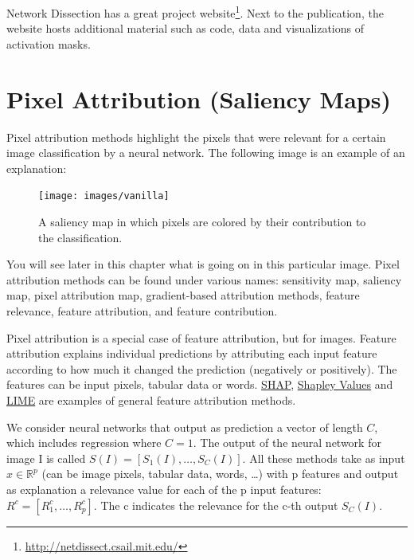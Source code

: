 \documentclass[
  12pt,
]{krantz}
\renewcommand{\href}[2]{#2\footnote{\url{#1}}}
\begin{document}
Network Dissection has a great \href{http://netdissect.csail.mit.edu/}{project website}.
Next to the publication, the website hosts additional material such as code, data and visualizations of activation masks.

\newpage

\hypertarget{pixel-attribution}{%
\section{Pixel Attribution (Saliency Maps)}\label{pixel-attribution}}

Pixel attribution methods highlight the pixels that were relevant for a certain image classification by a neural network.
The following image is an example of an explanation:

\begin{figure}

{\centering \texttt{[image: images/vanilla]} 

}

\caption{A saliency map in which pixels are colored by their contribution to the classification.}\label{fig:unnamed-chunk-61}
\end{figure}

You will see later in this chapter what is going on in this particular image.
Pixel attribution methods can be found under various names: sensitivity map, saliency map, pixel attribution map, gradient-based attribution methods, feature relevance, feature attribution, and feature contribution.

Pixel attribution is a special case of feature attribution, but for images.
Feature attribution explains individual predictions by attributing each input feature according to how much it changed the prediction (negatively or positively).
The features can be input pixels, tabular data or words.
\protect\hyperlink{shap}{SHAP}, \protect\hyperlink{shapley}{Shapley Values} and \protect\hyperlink{lime}{LIME} are examples of general feature attribution methods.

We consider neural networks that output as prediction a vector of length \(C\), which includes regression where \(C=1\).
The output of the neural network for image I is called \(S(I)=[S_1(I),\ldots,S_C(I)]\).
All these methods take as input \(x\in\mathbb{R}^p\) (can be image pixels, tabular data, words, \ldots) with p features and output as explanation a relevance value for each of the p input features: \(R^c=[R_1^c,\ldots,R_p^c]\).
The c indicates the relevance for the c-th output \(S_C(I)\).
\end{document}
